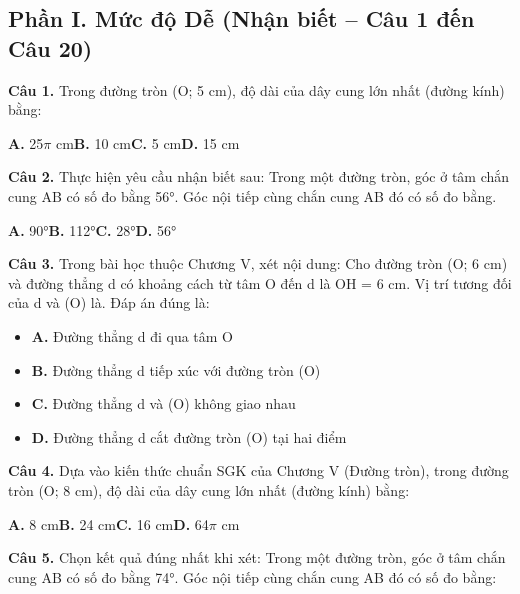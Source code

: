 \documentclass[11pt,a4paper]{article}
\begin{document}
\subsection*{\color{accent} Phần I. Mức độ Dễ (Nhận biết -- Câu 1 đến Câu 20)}
\textbf{\color{primary} Câu 1.} Trong đường tròn (O; 5 cm), độ dài của dây cung lớn nhất (đường kính) bằng:\par
\hspace*{1.5em}\textbf{A.} 25$\pi$ cm\quad\quad \textbf{B.} 10 cm\quad\quad \textbf{C.} 5 cm\quad\quad \textbf{D.} 15 cm\par\vspace{2pt}
\textbf{\color{primary} Câu 2.} Thực hiện yêu cầu nhận biết sau: Trong một đường tròn, góc ở tâm chắn cung AB có số đo bằng 56°. Góc nội tiếp cùng chắn cung AB đó có số đo bằng.\par
\hspace*{1.5em}\textbf{A.} 90°\quad\quad \textbf{B.} 112°\quad\quad \textbf{C.} 28°\quad\quad \textbf{D.} 56°\par\vspace{2pt}
\textbf{\color{primary} Câu 3.} Trong bài học thuộc Chương V, xét nội dung: Cho đường tròn (O; 6 cm) và đường thẳng d có khoảng cách từ tâm O đến d là OH = 6 cm. Vị trí tương đối của d và (O) là. Đáp án đúng là:\par
\begin{itemize}\setlength{\itemsep}{1pt}\setlength{\parskip}{0pt}
  \item[] \textbf{A.} Đường thẳng d đi qua tâm O
  \item[] \textbf{B.} Đường thẳng d tiếp xúc với đường tròn (O)
  \item[] \textbf{C.} Đường thẳng d và (O) không giao nhau
  \item[] \textbf{D.} Đường thẳng d cắt đường tròn (O) tại hai điểm
\end{itemize}\vspace{2pt}
\textbf{\color{primary} Câu 4.} Dựa vào kiến thức chuẩn SGK của Chương V (Đường tròn), trong đường tròn (O; 8 cm), độ dài của dây cung lớn nhất (đường kính) bằng:\par
\hspace*{1.5em}\textbf{A.} 8 cm\quad\quad \textbf{B.} 24 cm\quad\quad \textbf{C.} 16 cm\quad\quad \textbf{D.} 64$\pi$ cm\par\vspace{2pt}
\textbf{\color{primary} Câu 5.} Chọn kết quả đúng nhất khi xét: Trong một đường tròn, góc ở tâm chắn cung AB có số đo bằng 74°. Góc nội tiếp cùng chắn cung AB đó có số đo bằng:\par
\end{document}
